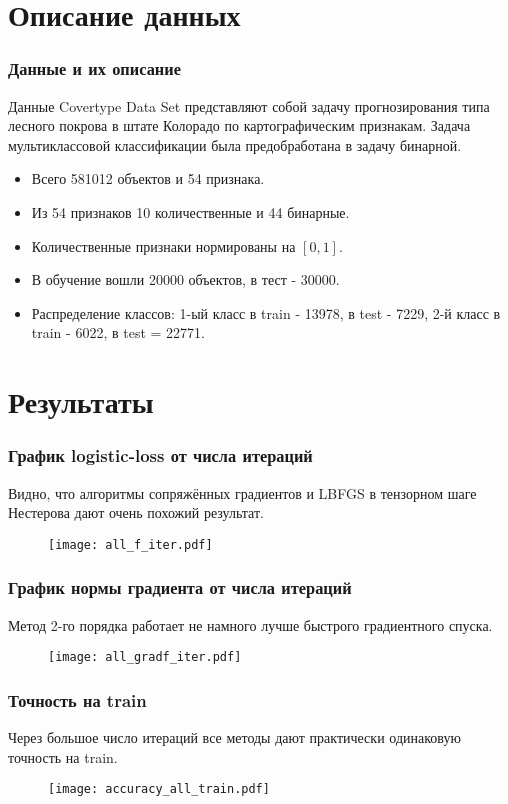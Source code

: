 \documentclass[12pt]{beamer}
\begin{document}
\section{Описание данных}
\begin{frame}
\frametitle{Данные и их описание}
Данные Covertype Data Set представляют собой задачу прогнозирования типа лесного покрова в штате Колорадо по картографическим признакам. Задача мультиклассовой классификации была предобработана в задачу бинарной.
\newline
\begin{itemize}
	\item Всего 581012 объектов и 54 признака.
	\item Из 54 признаков 10 количественные и 44 бинарные.
	\item Количественные признаки нормированы на $[0, 1]$.
	\item В обучение вошли 20000 объектов, в тест - 30000.
	\item Распределение классов: 1-ый класс в train - 13978, в test - 7229, 2-й класс в train - 6022, в test = 22771.
\end{itemize}
\end{frame}

\section{Результаты}
\begin{frame}
\frametitle{График logistic-loss от числа итераций}
Видно, что алгоритмы сопряжённых градиентов и LBFGS в тензорном шаге Нестерова дают очень похожий результат.
\begin{figure}
\texttt{[image: all\_f\_iter.pdf]}
\end{figure}
\end{frame}

\begin{frame}
\frametitle{График нормы градиента от числа итераций}
Метод 2-го порядка работает не намного лучше быстрого градиентного спуска.
\begin{figure}
	\texttt{[image: all\_gradf\_iter.pdf]}
\end{figure}
\end{frame}

\begin{frame}
\frametitle{Точность на train}
Через большое число итераций все методы дают практически одинаковую точность на train.
\begin{figure}
	\texttt{[image: accuracy\_all\_train.pdf]}
\end{figure}
\end{frame}
\end{document}
